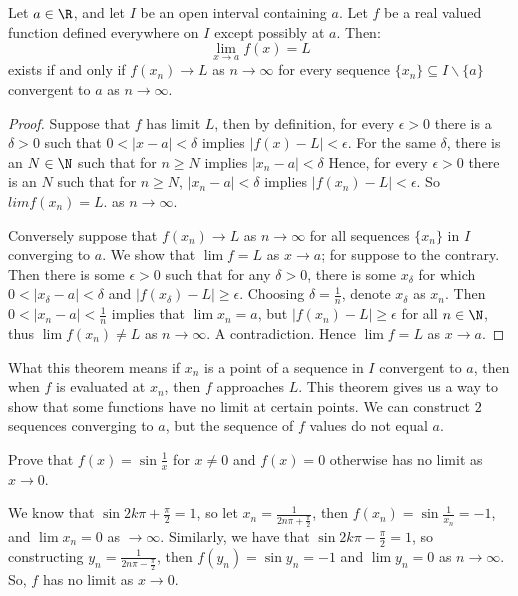 \begin{theorem}\label{3.1.1}
    Let $a \in \R$, and let $I$ be an open interval containing $a$. Let $f$ be 
    a real valued function defined everywhere on  $I$ except possibly at  $a$. 
    Then:
        \begin{equation*}
            \lim_{x \rightarrow a}{f(x)}=L
        \end{equation*}
        exists if and only if $f(x_n) \rightarrow L$ as $n \rightarrow \infty$ for every 
        sequence $\{x_n\} \subseteq I \backslash \{a\}$ convergent to  $a$ as 
        $n \rightarrow \infty$.
\end{theorem}
\begin{proof}
    Suppose that $f$ has limit $L$, then by definition, for every  $\epsilon>0$ 
    there is a  $\delta>0$ such that  $0<|x-a|<\delta$ implies  $|f(x)-L|<\epsilon$.
    For the same $\delta$, there is an  $N \in \N$ such that for  $n \geq N$ implies 
     $|x_n-a|<\delta$ Hence, for every  $\epsilon>0$ there is an $N$ such that for 
     $n \geq N$,  $|x_n-a|<\delta$ implies  $|f(x_n)-L|<\epsilon$. So  $lim{f(x_n)}=L$. 
     as $n \rightarrow \infty$.

     Conversely suppose that  $f(x_n) \rightarrow L$ as  $n \rightarrow \infty$ 
     for all sequences  $\{x_n\}$ in  $I$ converging to  $a$. We show that  $\lim{f}=L$ 
     as  $x \rightarrow a$; for suppose to the contrary. Then there is some  $\epsilon>0$ 
     such that for any $\delta>0$, there is some  $x_{\delta}$ for which $0<|x_{\delta}-a|<\delta$ 
     and $|f(x_{\delta})-L| \geq \epsilon$. Choosing  $\delta=\frac{1}{n}$, denote
     $x_{\delta}$ as  $x_n$. Then  $0<|x_n-a|<\frac{1}{n}$ implies that $\lim{x_n}=a$, 
     but  $|f(x_n)-L| \geq \epsilon$ for all  $n \in \N$, thus  $\lim{f(x_n) \neq L}$ 
     as  $n \rightarrow \infty$. A contradiction. Hence  $\lim{f}=L$ as  $x \rightarrow a$.
\end{proof}

What this theorem means if $x_n$ is a point of a sequence in  $I$ convergent to 
$a$, then when $f$ is evaluated at  $x_n$, then $f$ approaches $L$. This theorem 
gives us a way to show that some functions have no limit at certain points. We 
can construct $2$ sequences converging to $a$, but the sequence of  $f$ values do 
not equal $a$.

\begin{example}
    Prove that $f(x)=\sin{\frac{1}{x}}$ for $x \neq 0$ and $f(x)=0$ otherwise has 
    no limit as  $x \rightarrow 0$.
\end{example} 
\begin{solution}
    We know that $\sin{2k\pi+\frac{\pi}{2}}=1$, so let $x_n= \frac{1}{2n\pi+\frac{\pi}{2}}$, 
    then $f(x_n)=\sin{\frac{1}{x_n}}=-1$, and $\lim{x_n}=0$ as $\rightarrow \infty$. 
    Similarly, we have that $\sin{2k\pi-\frac{\pi}{2}}=1$, so constructing $y_n=
    \frac{1}{2n\pi-\frac{\pi}{2}}$, then $f(y_n)=\sin{y_n}=-1$ and $\lim{y_n}=0$ 
    as  $n \rightarrow \infty$. So, $f$ has no limit as  $x \rightarrow 0$.
\end{solution}

